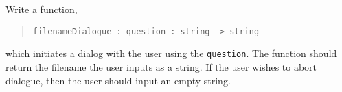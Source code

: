 \label{io:filenameDialogue}
Write a function,
\begin{quote}
  \mbox{\lstinline!filenameDialogue : question : string -> string!}
\end{quote}
which initiates a dialog with the user using the
\lstinline{question}. The function should return the filename the user
inputs as a string. If the user wishes to abort dialogue, then the
user should input an empty string.
